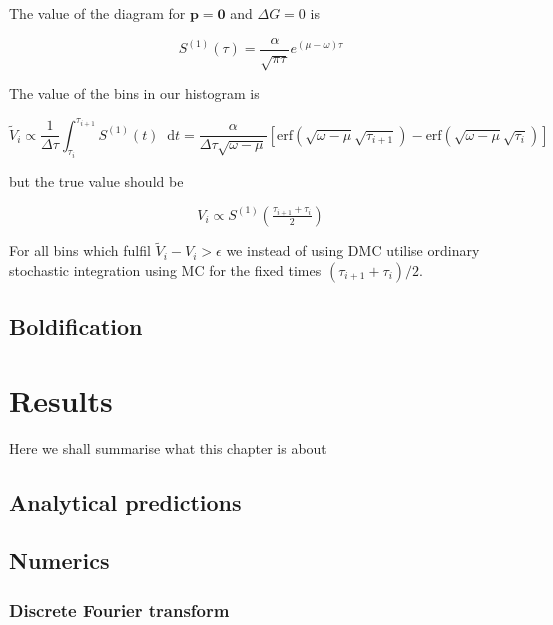 \documentclass[12pt]{report}
\renewcommand{\vec}[1]{\boldsymbol{\mathbf{#1}}}                        %
\newcommand*\diff{\mathop{}\!\mathrm{d}}
\newcommand{\todo}[1]{{\leavevmode\color{todo}#1}}
\begin{document}
The value of the diagram for $ \vec p = \vec 0 $ and $ \Delta G = 0 $ is

\begin{equation}
	S^{(1)}(\tau) = \frac{\alpha}{\sqrt{\pi \tau}} e^{(\mu - \omega)\tau}
\end{equation}

The value of the bins in our histogram is

\begin{equation}
	\tilde V_i \propto \frac{1}{\Delta \tau} \int_{\tau_i}^{\tau_{i + 1}} S^{(1)} (t) \diff t
	= \frac{\alpha}{\Delta \tau \sqrt{\omega - \mu}} \left[ \text{erf}\left(\sqrt{\omega - \mu} \sqrt{\tau_{i+1}}\right) - \text{erf}\left(\sqrt{\omega - \mu} \sqrt{\tau_i}\right) \right]
\end{equation}

 but the true value should be
 
\begin{equation}
	V_i \propto S^{(1)} \left( \tfrac{\tau_{i+1} + \tau_i}{2} \right)	
\end{equation}

For all bins which fulfil $ \tilde V_i  - V_i > \epsilon $ we instead of using DMC utilise ordinary stochastic integration using MC for the fixed times $ (\tau_{i+1} + \tau_i)/2 $.

\section{Boldification}




\chapter{Results}
\todo{Here we shall summarise what this chapter is about}

\section{Analytical predictions}

\section{Numerics}

\subsection{Discrete Fourier transform}
\end{document}
